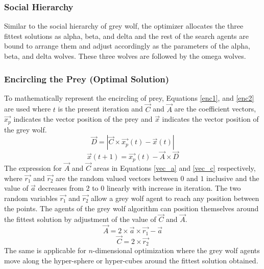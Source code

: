 \documentclass{llncs}
\begin{document}
\subsubsection{Social Hierarchy}
Similar to the social hierarchy of grey wolf, the optimizer allocates the three fittest solutions as alpha, beta, and delta and the rest of the search agents are bound to arrange them and adjust accordingly as the parameters of the alpha, beta, and delta wolves. These three wolves are followed by the omega wolves.
\subsubsection{Encircling the Prey (Optimal Solution)}
To mathematically represent the encircling of prey, Equations \ref{enc1}, and \ref{enc2} are used where $t$ is the present iteration and $\Vec{C}$ and $\Vec{A}$ are the coefficient vectors, $\Vec{x_p}$ indicates the vector position of the prey and $\Vec{x}$ indicates the vector position of the grey wolf.
\begin{equation}\label{enc1}
    \Vec{D}=|\Vec{C}\times\Vec{x_p}(t)-\Vec{x}(t)|
\end{equation}
\begin{equation}\label{enc2}
    \Vec{x}(t+1)=\Vec{x_p}(t)-\Vec{A}\times\Vec{D}
\end{equation}
The expression for $\Vec{A}$ and $\Vec{C}$ areas in Equations \ref{vec_a} and \ref{vec_c} respectively, where $\Vec{r_1}$ and $\Vec{r_2}$ are the random valued vectors between $0$ and $1$ inclusive and the value of $\Vec{a}$ decreases from $2$ to $0$ linearly with increase in iteration. The two random variables $\Vec{r_1}$ and $\Vec{r_2}$ allow a grey wolf agent to reach any position between the points. The agents of the grey wolf algorithm can position themselves around the fittest solution by adjustment of the value of $\Vec{C}$ and $\Vec{A}$. 
\begin{equation}\label{vec_a}
    \Vec{A}=2\times\Vec{a}\times\Vec{r_1}-\Vec{a}
\end{equation}
\begin{equation}\label{vec_c}
    \Vec{C}=2\times\Vec{r_2}
\end{equation}
The same is applicable for $n$-dimensional optimization where the grey wolf agents move along the hyper-sphere or hyper-cubes around the fittest solution obtained.
\end{document}

